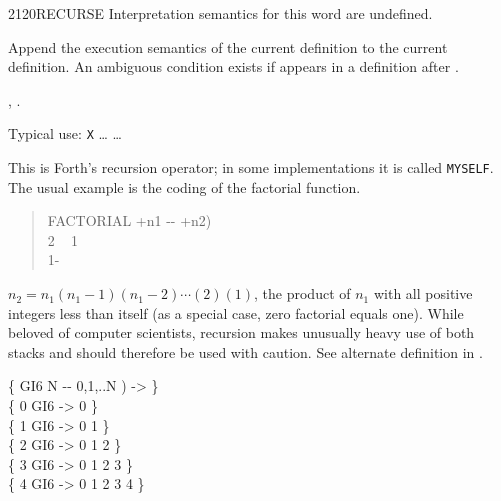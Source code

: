 \begin{worddef}{2120}{RECURSE}
\interpret
	Interpretation semantics for this word are undefined.

\compile
	\stack{}{}

	Append the execution semantics of the current definition to
	the current definition. An ambiguous condition exists if
	 appears in a definition after .

\see {},
	.

	\begin{defer}
	\rationale %
		Typical use:
			\word{:} \texttt{X} {\ldots}  {\ldots} \word{;}

		This is Forth's recursion operator; in some implementations it
		is called \texttt{MYSELF}. The usual example is the coding of
		the factorial function.

		\begin{quote}\ttfamily
		\word{:} FACTORIAL  +n1 -{}- +n2) \\
		\tab {} 2  ~
				 1 ~
			 \\
		\tab {} 1- ~~ \word{*} \\
		\word{;}
		\end{quote}

		$n_2 = n_1(n_1-1)(n_1-2)\cdots(2)(1)$, the product of $n_1$
		with all positive integers less than itself (as a special case,
		zero factorial equals one). While beloved of computer scientists,
		recursion makes unusually heavy use of both stacks and should
		therefore be used with caution. See alternate definition in
		.

	\testing
		\{ \word{:} GI6  N -{}- 0,1,..N )  
			    
		 \word{;} -> \} \\
		\{ 0 GI6 -> 0 \} \\
		\{ 1 GI6 -> 0 1 \} \\
		\{ 2 GI6 -> 0 1 2 \} \\
		\{ 3 GI6 -> 0 1 2 3 \} \\
		\{ 4 GI6 -> 0 1 2 3 4 \}
	\end{defer}
\end{worddef}


